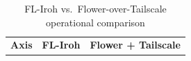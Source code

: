 \documentclass[a4paper,fleqn]{cas-dc}
\providecommand{\DIFaddbeginFL}{} %
\providecommand{\DIFdelbeginFL}{} %
\providecommand{\DIFdelendFL}{} %
\begin{document}
\begin{table}[t]
\centering
\caption{FL-Iroh vs.\ Flower-over-Tailscale operational comparison}
\label{tab:e7}
\footnotesize
\renewcommand{\arraystretch}{1.25}
\setlength{\tabcolsep}{4pt}
\DIFdelbeginFL %
\DIFdelendFL \DIFaddbeginFL \begin{tabular}{p{2.4cm} p{6.2cm} p{6.2cm}}
\toprule
\textbf{Axis} & \textbf{FL-Iroh} & \textbf{Flower + Tailscale} \\

\end{tabular}
\end{table}
\end{document}
